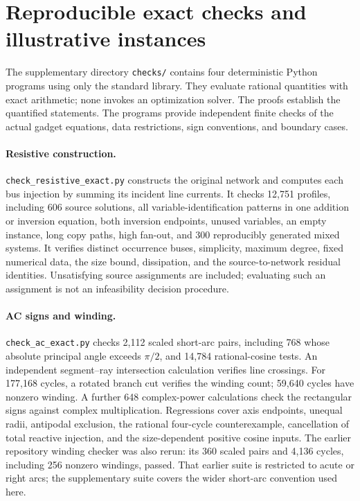 \section{Reproducible exact checks and illustrative instances}
\label{app:verification}

The supplementary directory \texttt{checks/} contains four deterministic
Python programs using only the standard library. They evaluate rational
quantities with exact arithmetic; none invokes an optimization solver.
The proofs establish the quantified statements. The programs provide
independent finite checks of the actual gadget equations, data restrictions,
sign conventions, and boundary cases.

\paragraph{Resistive construction.}
\texttt{check\_resistive\_exact.py} constructs the original network and
computes each bus injection by summing its incident line currents. It checks
12,751 profiles, including 606 source solutions, all variable-identification
patterns in one addition or inversion equation, both inversion endpoints,
unused variables, an empty instance, long copy paths, high fan-out, and
300 reproducibly generated mixed systems. It verifies distinct occurrence
buses, simplicity, maximum degree, fixed numerical data, the size bound,
dissipation, and the source-to-network residual identities. Unsatisfying
source assignments are included; evaluating such an assignment is not an
infeasibility decision procedure.

\paragraph{AC signs and winding.}
\texttt{check\_ac\_exact.py} checks 2,112 scaled short-arc pairs, including
768 whose absolute principal angle exceeds $\pi/2$, and 14,784 rational-cosine tests.
An independent segment--ray intersection calculation verifies line crossings.
For 177,168 cycles, a rotated branch cut verifies the winding count;
59,640 cycles have nonzero winding. A further 648 complex-power calculations
check the rectangular signs against complex multiplication. Regressions cover
axis endpoints, unequal radii, antipodal exclusion, the rational four-cycle
counterexample, cancellation of total reactive injection, and the
size-dependent positive cosine inputs. The earlier repository winding checker
was also rerun: its 360 scaled pairs and 4,136 cycles, including 256 nonzero
windings, passed. That earlier suite is restricted to acute or right arcs;
the supplementary suite covers the wider short-arc convention used here.

